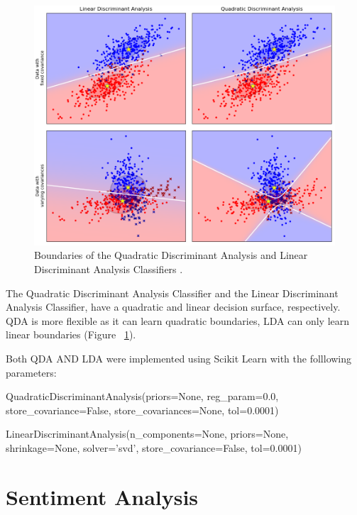 \begin{figure}[h!]
\centering
\includegraphics[width=1\textwidth]{design_and_methodology/qda_and_lda.png}
\caption{\label{fig:qdalda} Boundaries of the Quadratic Discriminant Analysis and Linear Discriminant Analysis Classifiers \cite{scikit-learn}.}
\end{figure}

The Quadratic Discriminant Analysis Classifier and the Linear Discriminant Analysis Classifier, have a quadratic and linear decision surface, respectively. QDA is more flexible as it can learn quadratic boundaries, LDA can only learn linear boundaries (Figure ~\ref{fig:qdalda}). 

Both QDA AND LDA were implemented using Scikit Learn with the folllowing parameters:

\begin{tcolorbox}
\begin{center}
	QuadraticDiscriminantAnalysis(priors=None, reg\_param=0.0, store\_covariance=False, store\_covariances=None, tol=0.0001)
\end{center}
\end{tcolorbox}

\begin{tcolorbox}
\begin{center}
	LinearDiscriminantAnalysis(n\_components=None, priors=None, shrinkage=None, solver='svd', store\_covariance=False, tol=0.0001)
\end{center}
\end{tcolorbox}


\section{Sentiment Analysis}

